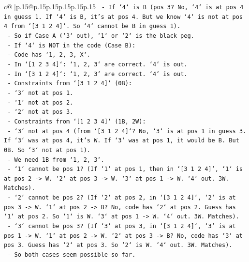 \documentclass{article}
\begin{document}
{\begin{supertabular}{c@{$\;$}|p{.15\linewidth}@{}p{.15\linewidth}p{.15\linewidth}p{.15\linewidth}p{.15\linewidth}p{.15\linewidth}}
{{{\texttt{                            {-} If `4` is B (pos 3? No, `4` is at pos 4 in guess 1. If `4` is B, it's at pos 4. But we know `4` is not at pos 4 from `{[}3 1 2 4{]}`. So `4` cannot be B in guess 1).} \\
\texttt{                            {-} So if Case A (`3` out), `1` or `2` is the black peg.} \\
\texttt{                {-} If `4` is NOT in the code (Case B):} \\
\texttt{                    {-} Code has `1, 2, 3, X`.} \\
\texttt{                    {-} In `{[}1 2 3 4{]}`: `1, 2, 3` are correct. `4` is out.} \\
\texttt{                    {-} In `{[}3 1 2 4{]}`: `1, 2, 3` are correct. `4` is out.} \\
\texttt{                    {-} Constraints from `{[}3 1 2 4{]}` (0B):} \\
\texttt{                        {-} `3` not at pos 1.} \\
\texttt{                        {-} `1` not at pos 2.} \\
\texttt{                        {-} `2` not at pos 3.} \\
\texttt{                    {-} Constraints from `{[}1 2 3 4{]}` (1B, 2W):} \\
\texttt{                        {-} `3` not at pos 4 (from `{[}3 1 2 4{]}`? No, `3` is at pos 1 in guess 3. If `3` was at pos 4, it's W. If `3` was at pos 1, it would be B. But 0B. So `3` not at pos 1).} \\
\texttt{                        {-} We need 1B from `1, 2, 3`.} \\
\texttt{                        {-} `1` cannot be pos 1? (If `1` at pos 1, then in `{[}3 1 2 4{]}`, `1` is at pos 2 {-}> W. `2` at pos 3 {-}> W. `3` at pos 1 {-}> W. `4` out. 3W. Matches).} \\
\texttt{                        {-} `2` cannot be pos 2? (If `2` at pos 2, in `{[}3 1 2 4{]}`, `2` is at pos 3 {-}> W. `1` at pos 2 {-}> B? No, code has `2` at pos 2. Guess has `1` at pos 2. So `1` is W. `3` at pos 1 {-}> W. `4` out. 3W. Matches).} \\
\texttt{                        {-} `3` cannot be pos 3? (If `3` at pos 3, in `{[}3 1 2 4{]}`, `3` is at pos 1 {-}> W. `1` at pos 2 {-}> W. `2` at pos 3 {-}> B? No, code has `3` at pos 3. Guess has `2` at pos 3. So `2` is W. `4` out. 3W. Matches).} \\
\texttt{                    {-} So both cases seem possible so far.} \\
}}}
\end{supertabular}}
\end{document}
